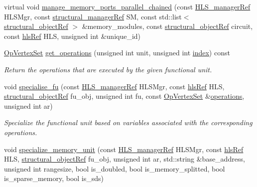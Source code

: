 \begin{DoxyCompactItemize}
\item 
virtual void \hyperlink{classfu__binding_a18f39279fa00ac40a2990cdbff230485}{manage\+\_\+memory\+\_\+ports\+\_\+parallel\+\_\+chained} (const \hyperlink{hls__manager_8hpp_acd3842b8589fe52c08fc0b2fcc813bfe}{H\+L\+S\+\_\+manager\+Ref} H\+L\+S\+Mgr, const \hyperlink{structural__manager_8hpp_ab3136f0e785d8535f8d252a7b53db5b5}{structural\+\_\+manager\+Ref} SM, const std\+::list$<$ \hyperlink{structural__objects_8hpp_a8ea5f8cc50ab8f4c31e2751074ff60b2}{structural\+\_\+object\+Ref} $>$ \&memory\+\_\+modules, const \hyperlink{structural__objects_8hpp_a8ea5f8cc50ab8f4c31e2751074ff60b2}{structural\+\_\+object\+Ref} circuit, const \hyperlink{hls_8hpp_a75d0c73923d0ddfa28c4843a802c73a7}{hls\+Ref} H\+LS, unsigned int \&unique\+\_\+id)
\item 
\hyperlink{classOpVertexSet}{Op\+Vertex\+Set} \hyperlink{classfu__binding_a478de19203821bdd6af592a06306a34e}{get\+\_\+operations} (unsigned int unit, unsigned int \hyperlink{tutorial__pact__2019_2Introduction_2third_2include_2Keccak_8h_a028c9bdc8344cca38ab522a337074797}{index}) const
\begin{DoxyCompactList}\small\item\em Return the operations that are executed by the given functional unit. \end{DoxyCompactList}\item 
void \hyperlink{classfu__binding_ab83a37f707ea824594822564d97060a4}{specialise\+\_\+fu} (const \hyperlink{hls__manager_8hpp_acd3842b8589fe52c08fc0b2fcc813bfe}{H\+L\+S\+\_\+manager\+Ref} H\+L\+S\+Mgr, const \hyperlink{hls_8hpp_a75d0c73923d0ddfa28c4843a802c73a7}{hls\+Ref} H\+LS, \hyperlink{structural__objects_8hpp_a8ea5f8cc50ab8f4c31e2751074ff60b2}{structural\+\_\+object\+Ref} fu\+\_\+obj, unsigned int fu, const \hyperlink{classOpVertexSet}{Op\+Vertex\+Set} \&\hyperlink{classfu__binding_a7317a9846ee0032ec80d2c46b015e29f}{operations}, unsigned int ar)
\begin{DoxyCompactList}\small\item\em Specialize the functional unit based on variables associated with the corresponding operations. \end{DoxyCompactList}\item 
void \hyperlink{classfu__binding_a9b6236984045631086c488e5cc127902}{specialize\+\_\+memory\+\_\+unit} (const \hyperlink{hls__manager_8hpp_acd3842b8589fe52c08fc0b2fcc813bfe}{H\+L\+S\+\_\+manager\+Ref} H\+L\+S\+Mgr, const \hyperlink{hls_8hpp_a75d0c73923d0ddfa28c4843a802c73a7}{hls\+Ref} H\+LS, \hyperlink{structural__objects_8hpp_a8ea5f8cc50ab8f4c31e2751074ff60b2}{structural\+\_\+object\+Ref} fu\+\_\+obj, unsigned int ar, std\+::string \&base\+\_\+address, unsigned int rangesize, bool is\+\_\+doubled, bool is\+\_\+memory\+\_\+splitted, bool is\+\_\+sparse\+\_\+memory, bool is\+\_\+sds)

\end{DoxyCompactItemize}
